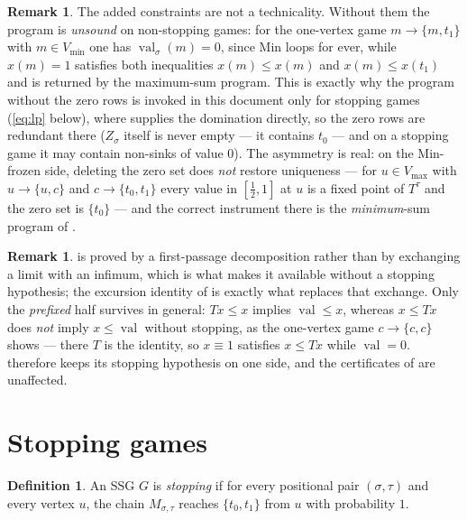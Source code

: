 \documentclass[11pt]{article}
\theoremstyle{plain}
\theoremstyle{definition}
\newtheorem{definition}[theorem]{Definition}
\newtheorem{remark}[theorem]{Remark}
\DeclareMathOperator{\val}{val}
\newcommand{\Vmax}{V_{\max}}
\newcommand{\Vmin}{V_{\min}}
\begin{document}
\begin{remark}\label{rem:lp-needs-zeros}
The added constraints are not a technicality. Without them the program is
\emph{unsound} on non-stopping games: for the one-vertex game
$m\to\{m,t_1\}$ with $m\in\Vmin$ one has $\val_\sigma(m)=0$, since Min
loops for ever, while $x(m)=1$ satisfies both inequalities
$x(m)\le x(m)$ and $x(m)\le x(t_1)$ and is returned by the
maximum-sum program. This is exactly why the program without the zero rows is
invoked in this document only for stopping games (\eqref{eq:lp} below),
where  supplies the domination directly, so the zero
rows are redundant there ($Z_\sigma$ itself is never empty --- it contains
$t_0$ --- and on a stopping game it may contain non-sinks of value $0$). The
asymmetry is real: on the Min-frozen side, deleting the zero set does
\emph{not} restore uniqueness --- for $u\in\Vmax$ with $u\to\{u,c\}$ and
$c\to\{t_0,t_1\}$ every value in $[\tfrac12,1]$ at $u$ is a fixed point of
$T^\tau$ and the zero set is $\{t_0\}$ --- and the correct instrument there
is the
\emph{minimum}-sum program of .
\end{remark}


\begin{remark}\label{rem:lfp-scope}
 is proved by a first-passage decomposition rather
than by exchanging a limit with an infimum, which is what makes it
available without a stopping hypothesis; the excursion identity of
 is exactly what replaces that exchange. Only the
\emph{prefixed} half survives in general: $Tx\le x$ implies $\val\le x$,
whereas $x\le Tx$ does \emph{not} imply $x\le\val$ without stopping, as
the one-vertex game $c\to\{c,c\}$ shows --- there $T$ is the identity, so
$x\equiv1$ satisfies $x\le Tx$ while $\val=0$. 
therefore keeps its stopping hypothesis on one side, and the certificates
of  are unaffected.
\end{remark}

\section{Stopping games}\label{sec:stopping}

\begin{definition}\label{def:stopping}
An SSG $G$ is \emph{stopping} if for every positional pair
$(\sigma,\tau)$ and every vertex $u$, the chain $M_{\sigma,\tau}$ reaches
$\{t_0,t_1\}$ from $u$ with probability $1$.
\end{definition}
\end{document}
